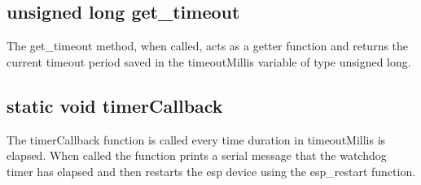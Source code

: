 \subsection{unsigned long get\_timeout}
\label{subsec:Watchdog_get_timeout}
The get\_timeout method, when called, acts as a getter function and returns the current timeout period saved in the timeoutMillis variable of type unsigned long. 

\subsection{static void timerCallback}
\label{subsec:Watchdog_timerCallback}
The timerCallback function is called every time duration in timeoutMillis is elapsed. 
When called the function prints a serial message that the watchdog timer has elapsed and then restarts the esp device using the esp\_restart function. 
